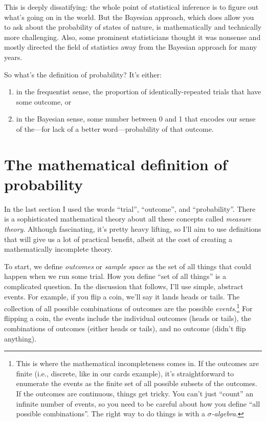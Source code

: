 This is deeply dissatifying: the whole point of statistical inference is to
figure out what's going on in the world. But the Bayesian approach, which does
allow you to ask about the probability of states of nature, is mathematically
and technically more challenging. Also, some prominent statisticians thought
it was nonsense and mostly directed the field of statistics away from the Bayesian
approach for many years.

So what's the definition of probability? It's either:
\begin{enumerate}
\item in the frequentist sense, the proportion of identically-repeated trials that have some outcome, or
\item in the Bayesian sense, some number between 0 and 1 that encodes our sense of the---for lack of a better word---probability of that outcome.
\end{enumerate}

\section{The mathematical definition of probability}

In the last section I used the words ``trial'', ``outcome'', and
``probability''.  There is a sophisticated mathematical theory about all these
concepts called \emph{measure theory}. Although fascinating, it's pretty heavy
lifting, so I'll aim to use definitions that will give us a lot of practical
benefit, albeit at the cost of creating a mathematically incomplete theory.

To start, we define \emph{outcomes} or \emph{sample space} as the set of all
things that could happen when we run some trial. How you define ``set of all
things'' is a complicated question. In the discussion that follows, I'll use
simple, abstract events. For example, if you flip a coin, we'll say it lands
heads or tails. The collection of all possible combinations of outcomes are
the possible \emph{events}.\footnote{This is where the mathematical
incompleteness comes in. If the outcomes are finite (i.e., discrete, like in
our cards example), it's straightforward to enumerate the events as the finite
set of all possible subsets of the outcomes. If the outcomes are continuous,
things get tricky. You can't just ``count'' an infinite number of events, so
you need to be careful about how you define ``all possible combinations''. The
right way to do things is with a \emph{$\sigma$-algebra}.} For flipping a
coin, the events include the individual outcomes (heads or tails), the
combinations of outcomes (either heads or tails), and no outcome (didn't flip
anything).

